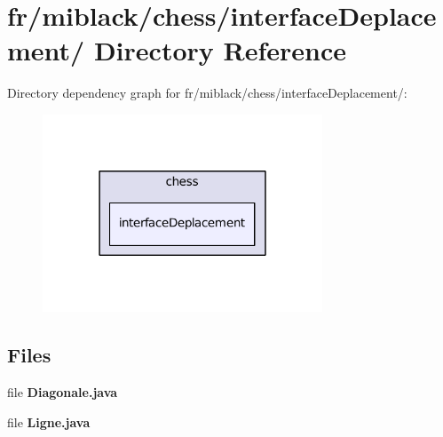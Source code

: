 \section{fr/miblack/chess/interface\-Deplacement/ Directory Reference}
\label{dir_03243d6347e32f2c7a97b580c7a464f9}
Directory dependency graph for fr/miblack/chess/interface\-Deplacement/\-:
\nopagebreak
\begin{figure}[H]
\begin{center}
\leavevmode
\includegraphics[width=236pt]{dir_03243d6347e32f2c7a97b580c7a464f9_dep}
\end{center}
\end{figure}
\subsection*{Files}
\begin{DoxyCompactItemize}
\item 
file {\bf Diagonale.\-java}
\item 
file {\bf Ligne.\-java}
\end{DoxyCompactItemize}
